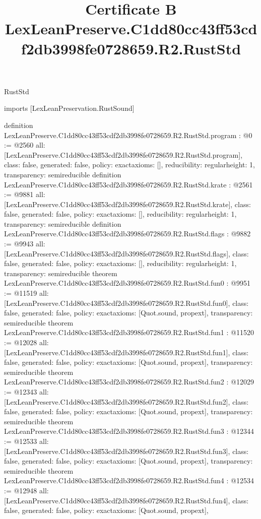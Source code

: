 \begin{lexlean}{RustStd}
\title{Certificate B LexLeanPreserve.C1dd80cc43ff53cdf2db3998fe0728659.R2.RustStd}
\begin{coremodule}
imports [LexLeanPreservation.RustSound]

definition LexLeanPreserve.C1dd80cc43ff53cdf2db3998fe0728659.R2.RustStd.program : @0 := @2560 {
  all: [LexLeanPreserve.C1dd80cc43ff53cdf2db3998fe0728659.R2.RustStd.program],
  class: false,
  generated: false,
  policy: exact{axioms: []},
  reducibility: regular{height: 1},
  transparency: semireducible
}
definition LexLeanPreserve.C1dd80cc43ff53cdf2db3998fe0728659.R2.RustStd.krate : @2561 := @9881 {
  all: [LexLeanPreserve.C1dd80cc43ff53cdf2db3998fe0728659.R2.RustStd.krate],
  class: false,
  generated: false,
  policy: exact{axioms: []},
  reducibility: regular{height: 1},
  transparency: semireducible
}
definition LexLeanPreserve.C1dd80cc43ff53cdf2db3998fe0728659.R2.RustStd.flags : @9882 := @9943 {
  all: [LexLeanPreserve.C1dd80cc43ff53cdf2db3998fe0728659.R2.RustStd.flags],
  class: false,
  generated: false,
  policy: exact{axioms: []},
  reducibility: regular{height: 1},
  transparency: semireducible
}
theorem LexLeanPreserve.C1dd80cc43ff53cdf2db3998fe0728659.R2.RustStd.fun0 : @9951 := @11519 {
  all: [LexLeanPreserve.C1dd80cc43ff53cdf2db3998fe0728659.R2.RustStd.fun0],
  class: false,
  generated: false,
  policy: exact{axioms: [Quot.sound, propext]},
  transparency: semireducible
}
theorem LexLeanPreserve.C1dd80cc43ff53cdf2db3998fe0728659.R2.RustStd.fun1 : @11520 := @12028 {
  all: [LexLeanPreserve.C1dd80cc43ff53cdf2db3998fe0728659.R2.RustStd.fun1],
  class: false,
  generated: false,
  policy: exact{axioms: [Quot.sound, propext]},
  transparency: semireducible
}
theorem LexLeanPreserve.C1dd80cc43ff53cdf2db3998fe0728659.R2.RustStd.fun2 : @12029 := @12343 {
  all: [LexLeanPreserve.C1dd80cc43ff53cdf2db3998fe0728659.R2.RustStd.fun2],
  class: false,
  generated: false,
  policy: exact{axioms: [Quot.sound, propext]},
  transparency: semireducible
}
theorem LexLeanPreserve.C1dd80cc43ff53cdf2db3998fe0728659.R2.RustStd.fun3 : @12344 := @12533 {
  all: [LexLeanPreserve.C1dd80cc43ff53cdf2db3998fe0728659.R2.RustStd.fun3],
  class: false,
  generated: false,
  policy: exact{axioms: [Quot.sound, propext]},
  transparency: semireducible
}
theorem LexLeanPreserve.C1dd80cc43ff53cdf2db3998fe0728659.R2.RustStd.fun4 : @12534 := @12948 {
  all: [LexLeanPreserve.C1dd80cc43ff53cdf2db3998fe0728659.R2.RustStd.fun4],
  class: false,
  generated: false,
  policy: exact{axioms: [Quot.sound, propext]},
}
\end{coremodule}
\end{lexlean}
